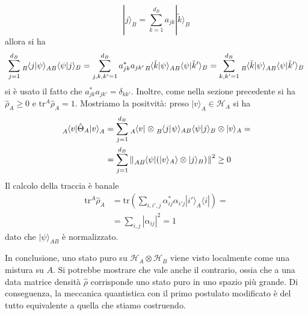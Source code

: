 \documentclass[a4paper, 11pt]{article}
\renewcommand{\H}{\mathcal{H}}
\newcommand{\tr}{\mathrm{tr}}
\renewcommand{\ket}[1]{| #1\rangle}
\renewcommand{\bra}[1]{\langle #1|}
\begin{document}
\[\ket{j}_B=\sum_{k=1}^{d_B}a_{jk}|\tilde{k}\rangle_{B}\]
allora si ha
\begin{align*}
	\sum_{j=1}^{d_B}\tensor*[_B]{\braket{j}{\psi}}{_{AB}}\braket{\psi}{j}_B=\sum_{j,k,k'=1}^{d_B}a^*_{jk}a_{jk'}\tensor*[_B]{\langle\tilde{k}\ket{\psi}}{_{AB}}\bra{\psi}\tilde{k}'\rangle_B=\sum_{k,k'=1}^{d_B}\tensor*[_B]{\langle\tilde{k}\ket{\psi}}{_{AB}}\bra{\psi}\tilde{k}'\rangle_B
\end{align*}
si è usato il fatto che $a^*_{jk}a_{jk'}=\delta_{kk'}$. Inoltre, come nella sezione precedente si ha $\hat{\rho}_A\geq0$ e $\tr^A\hat{\rho}_A=1$. Mostriamo la positvità: preso $\ket{v}_A\in\H_A$ si ha
\begin{align*}
	\tensor*[_A]{\braketop{v}{\hat{\Theta}_A}{v}}{_A}&=\sum_{j=1}^{d_B}\tensor*[_A]{\bra{v}}{}\otimes\tensor*[_B]{\bra{j}}{}\psi\rangle_{AB}\bra{\psi}j\rangle_B\otimes\ket{v}_A=\\&=\sum_{j=1}^{d_B}\norm {\tensor*[_{AB}]{\bra{\psi}(\ket{v}_A\rangle\otimes\ket{j}_B)}{}}^2\geq0
	\end{align*}
Il calcolo della traccia è banale
\begin{align*}\tr^A\hat{\rho}_A&=\tr\left(\sum_{i,i',j}\alpha^*_{ij}\alpha_{i'j}\ket{i'}_A\bra{i}\right)=\\&=\sum_{i,j}|\alpha_{ij}|^2=1\end{align*}
dato che $\ket{\psi}_{AB}$ è normalizzato.

In conclusione, uno stato puro su $\H_A\otimes\H_B$ viene visto localmente come una mistura su $A$. Si potrebbe mostrare che vale anche il contrario, ossia che a una data matrice densità $\hat{\rho}$ corrisponde uno stato puro in uno spazio più grande. Di conseguenza, la meccanica quantistica con il primo postulato modificato è del tutto equivalente a quella che stiamo costruendo.
\end{document}
